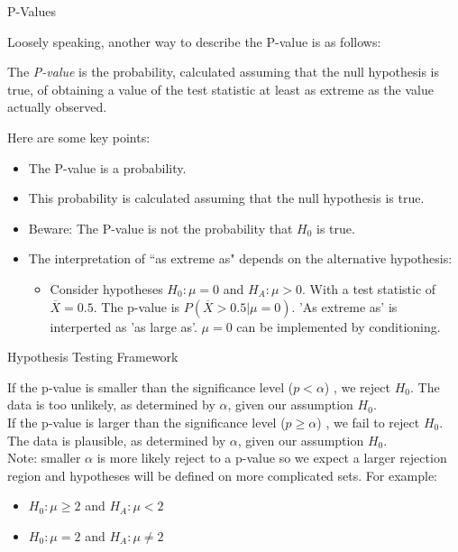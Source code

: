 \documentclass[t,handout]{beamer}
\newcommand{\nl}[1]{\vspace{#1 em}}
\begin{document}
            \begin{frame}{P-Values}
            
            Loosely speaking, another way to describe the P-value is as follows:
            \begin{block}{}
            The \emph{P-value} is the probability, calculated assuming that the null hypothesis is
            true, of obtaining a value of the test statistic at least as extreme as the value actually observed.
            \end{block}
            \pause
            Here are some key points:
            \begin{itemize}
            \item The P-value is a probability.
            \pause \item This probability is calculated assuming that the null hypothesis is true.
            \pause \item Beware: The P-value is not the probability that $H_0$ is true.
            \pause \item The interpretation of ``as extreme as" depends on the alternative hypothesis:
            \begin{itemize}
            \item Consider hypotheses $H_0: \mu = 0$ and $H_A: \mu > 0$. With a test statistic of $\overline{X} = 0.5$. The p-value is $P(\overline{X}>0.5|\mu=0)$. 'As extreme as' is interperted as 'as large as'. $\mu=0$ can be implemented by conditioning.
             \end{itemize}
            \end{itemize}
            \end{frame}

            \begin{frame}{Hypothesis Testing Framework}
            
                If the p-value is smaller than the significance level ($p<\alpha$) , we reject $H_0$. The data is too unlikely, as determined by $\alpha$, given our assumption $H_0$.
                \\
                \nl{0.5}
                If the p-value is larger than the significance level ($p\geq \alpha$) , we fail to reject $H_0$. The data is plausible, as determined by $\alpha$, given our assumption $H_0$.
                \\
                \nl{2}
                Note: smaller $\alpha$ is more likely reject to a p-value so we expect a larger rejection region and hypotheses will be defined on more complicated sets. For example:
                \begin{itemize}
                    \item $H_0: \mu \geq 2$ and $H_A: \mu <2$
                     \item $H_0: \mu = 2$ and $H_A: \mu \neq 2$
                \end{itemize}
            \end{frame}
\end{document}
